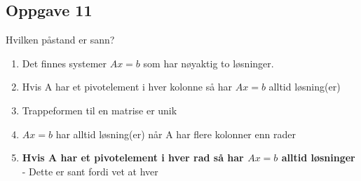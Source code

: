 \documentclass{article}
\begin{document}
\subsection*{Oppgave 11}
Hvilken påstand er sann?
\begin{enumerate}
    \item Det finnes systemer $Ax=b$ som har nøyaktig to løsninger.

    \item Hvis A har et pivotelement i hver kolonne så har $Ax=b$ alltid løsning(er)\\

    \item Trappeformen til en matrise er unik

    \item $Ax=b$ har alltid løsning(er) når A har flere kolonner enn rader

    \item \textbf{Hvis A har et pivotelement i hver rad så har $Ax = b$ alltid løsninger}\\
    - Dette er sant fordi vet at hver 
    
\end{enumerate} 
\end{document}

